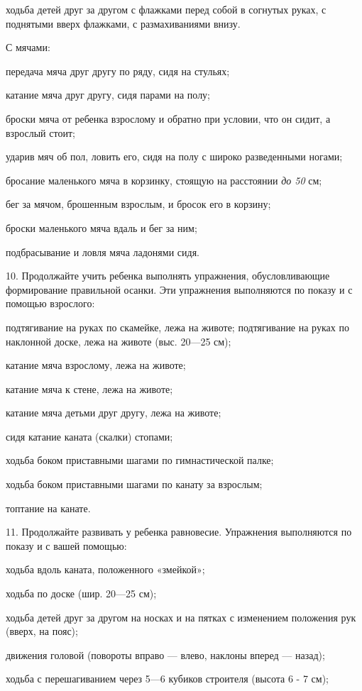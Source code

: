 \documentclass{book}
\renewcommand{\emph}[1]{\textit{#1}}
\begin{document}
ходьба детей друг за другом с флажками перед собой в согнутых руках, с
поднятыми вверх флажками, с размахиваниями внизу.

С мячами:

передача мяча друг другу по ряду, сидя на стульях;

катание мяча друг другу, сидя парами на полу;

броски мяча от ребенка взрослому и обратно при условии, что он сидит, а
взрослый стоит;

ударив мяч об пол, ловить его, сидя на полу с широко разведенными
ногами;

бросание маленького мяча в корзинку, стоящую на расстоянии \emph{до 50}
см;

бег за мячом, брошенным взрослым, и бросок его в корзину;

броски маленького мяча вдаль и бег за ним;

подбрасывание и ловля мяча ладонями сидя.

10. Продолжайте учить ребенка выполнять упражнения, обусловливающие
формирование правильной осанки. Эти упражнения выполняются по показу и с
помощью взрослого:

подтягивание на руках по скамейке, лежа на животе; подтягивание на руках
по наклонной доске, лежа на животе (выс. 20---25 см);

катание мяча взрослому, лежа на животе;

катание мяча к стене, лежа на животе;

катание мяча детьми друг другу, лежа на животе;

сидя катание каната (скалки) стопами;

ходьба боком приставными шагами по гимнастической палке;

ходьба боком приставными шагами по канату за взрослым;

топтание на канате.

11. Продолжайте развивать у ребенка равновесие. Упражнения выполняются
по показу и с вашей помощью:

ходьба вдоль каната, положенного «змейкой»;

ходьба по доске (шир. 20---25 см);

ходьба детей друг за другом на носках и на пятках с изменением положения
рук (вверх, на пояс);

движения головой (повороты вправо --- влево, наклоны вперед --- назад);

ходьба с перешагиванием через 5---6 кубиков строителя (высота 6 - 7 см);
\end{document}
